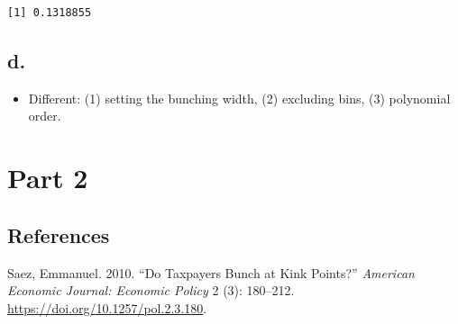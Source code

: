 \documentclass[
  letterpaper,
  DIV=11,
  numbers=noendperiod]{scrartcl}
\newenvironment{Shaded}{\begin{snugshade}}{\end{snugshade}}
\newcommand{\CommentTok}[1]{\textcolor[rgb]{0.37,0.37,0.37}{#1}}
\newcommand{\NormalTok}[1]{\textcolor[rgb]{0.00,0.23,0.31}{#1}}
\newcommand{\SpecialCharTok}[1]{\textcolor[rgb]{0.37,0.37,0.37}{#1}}
\providecommand{\tightlist}{%
  \setlength{\itemsep}{0pt}\setlength{\parskip}{0pt}}\usepackage{longtable,booktabs,array}
\newlength{\cslhangindent}
\newenvironment{CSLReferences}[2] %
 {\begin{list}{}{%
  \setlength{\itemindent}{0pt}
  \setlength{\leftmargin}{0pt}
  \setlength{\parsep}{0pt}
  \ifodd #1
   \setlength{\leftmargin}{\cslhangindent}
   \setlength{\itemindent}{-1\cslhangindent}
  \fi
  \setlength{\itemsep}{#2\baselineskip}}}
 {\end{list}}
\begin{document}
\begin{Shaded}
\end{Shaded}

\begin{verbatim}
[1] 0.1318855
\end{verbatim}

\subsection{d.}\label{d.}

\begin{itemize}
\tightlist
\item
  Different: (1) setting the bunching width, (2) excluding bins, (3)
  polynomial order.
\end{itemize}

\section{Part 2}\label{part-2}

\subsection*{References}\label{references}

\label{refs}
\begin{CSLReferences}{1}{0}
Saez, Emmanuel. 2010. {``Do Taxpayers Bunch at Kink Points?''}
\emph{American Economic Journal: Economic Policy} 2 (3): 180--212.
\url{https://doi.org/10.1257/pol.2.3.180}.

\end{CSLReferences}
\end{document}
